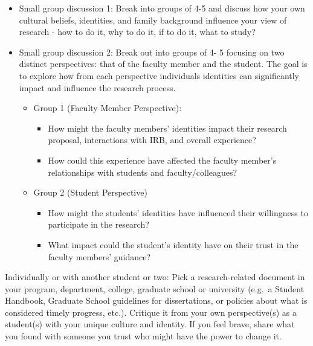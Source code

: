 \documentclass[
  11pt,
]{book}
\providecommand{\tightlist}{%
  \setlength{\itemsep}{0pt}\setlength{\parskip}{0pt}}
\begin{document}
\begin{itemize}
\tightlist
\item
  Small group discussion 1: Break into groups of 4-5 and discuss how your own cultural beliefs, identities, and family background influence your view of research - how to do it, why to do it, if to do it, what to study?
\item
  Small group discussion 2: Break out into groups of 4- 5 focusing on two distinct perspectives: that of the faculty member and the student. The goal is to explore how from each perspective individuals identities can significantly impact and influence the research process.

  \begin{itemize}
  \tightlist
  \item
    Group 1 (Faculty Member Perspective):

    \begin{itemize}
    \tightlist
    \item
      How might the faculty members' identities impact their research proposal, interactions with IRB, and overall experience?
    \item
      How could this experience have affected the faculty member's relationships with students and faculty/colleagues?
    \end{itemize}
  \item
    Group 2 (Student Perspective)

    \begin{itemize}
    \tightlist
    \item
      How might the students' identities have influenced their willingness to participate in the research?
    \item
      What impact could the student's identity have on their trust in the faculty members' guidance?
    \end{itemize}
  \end{itemize}
\end{itemize}

Individually or with another student or two: Pick a research-related document in your program, department, college, graduate school or university (e.g.~a Student Handbook, Graduate School guidelines for dissertations, or policies about what is considered timely progress, etc.). Critique it from your own perspective(s) as a student(s) with your unique culture and identity. If you feel brave, share what you found with someone you trust who might have the power to change it.
\end{document}
